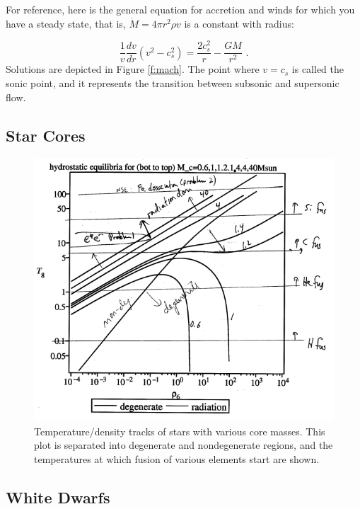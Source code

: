 For reference, here is the general equation for accretion and winds for which you have a steady state, that is, $\dot{M} = 4 \pi r^2 \rho v$ is a constant with radius:

\begin{equation}
\frac{1}{v} \frac{dv}{dr} (v^2 - c_s^2) = \frac{2 c_s^2}{r} - \frac{G M}{r^2}\,\,.
\end{equation}
Solutions are depicted in Figure \ref{f:mach}. The point where $v = c_s$ is called the sonic point, and it represents the transition between subsonic and supersonic flow.

\subsection{Star Cores}

\begin{figure}[!h]
\begin{center}
\includegraphics[width=\textwidth]{HE_starcore.jpg}
\caption{Temperature/density tracks of stars with various core masses. This plot is separated into degenerate and nondegenerate regions, and the temperatures at which fusion of various elements start are shown. \label{f:starcore}}
\end{center}
\end{figure}

\subsection{White Dwarfs}

